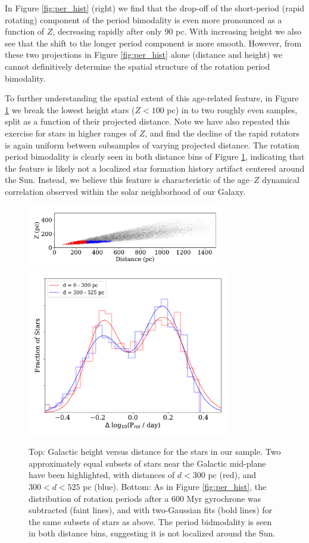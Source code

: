 \documentclass[preprint2]{aastex62}
\begin{document}
In Figure \ref{fig:per_hist} (right) we find that the drop-off of the short-period (rapid rotating) component of the period bimodality is even more pronounced as a function of $Z$, decreasing rapidly after only 90 pc. With increasing height we also see that the shift to the longer period component is more smooth. However, from these two projections in Figure \ref{fig:per_hist} alone (distance and height) we cannot definitively determine the spatial structure of the rotation period bimodality.


To further understanding the spatial extent of this age-related feature, in Figure \ref{fig:dZ} we break the lowest height stars ($Z < 100$ pc) in to two roughly even samples, split as a function of their projected distance. Note we have also repeated this exercise for stars in higher ranges of $Z$, and find the decline of the rapid rotators is again uniform between subsamples of varying projected distance. The rotation period bimodality is clearly seen in both distance bins of Figure \ref{fig:dZ}, indicating that the feature is likely not a localized star formation history artifact centered around the Sun. Instead, we believe this feature is characteristic of the age--$Z$ dynamical correlation observed within the solar neighborhood of our Galaxy. 


\begin{figure}[!ht]
\centering
\includegraphics[width=3.4in]{../figures/dist_Z}
\includegraphics[width=3.5in]{../figures/delta_per_subZ}
\caption{
Top: Galactic height versus distance for the stars in our sample. Two approximately equal subsets of stars near the Galactic mid-plane have been highlighted, with distances of $d<300$ pc (red), and $300<d<525$ pc (blue).
Bottom: As in Figure \ref{fig:per_hist}, the distribution of rotation periods after a 600 Myr gyrochrone was subtracted (faint lines), and with two-Gaussian fits (bold lines) for the same subsets of stars as above. The period bidmodality is seen in both distance bins, suggesting it is not localized around the Sun.
}
\label{fig:dZ}
\end{figure}
\end{document}

